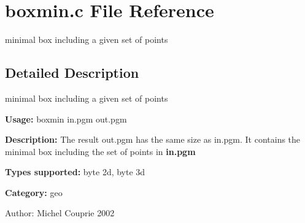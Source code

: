 \section{boxmin.c File Reference}
\label{boxmin_8c}
minimal box including a given set of points 



\subsection{Detailed Description}
minimal box including a given set of points 

{\bf Usage:} boxmin in.pgm out.pgm

{\bf Description:} The result out.pgm has the same size as in.pgm. It contains the minimal box including the set of points in {\bf in.pgm} 

{\bf Types supported:} byte 2d, byte 3d

{\bf Category:} geo

\begin{Desc}
\item[Author:]Michel Couprie 2002 \end{Desc}
